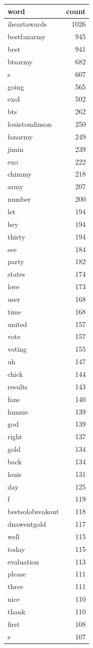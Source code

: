 \begin{tabular}{lr}
\toprule
word & count \\
\midrule
iheartawards & 1026 \\
bestfanarmy & 945 \\
best & 941 \\
btsarmy & 682 \\
s & 607 \\
going & 565 \\
exol & 502 \\
bts & 262 \\
louistomlinson & 250 \\
fanarmy & 249 \\
jimin & 239 \\
exo & 222 \\
chimmy & 218 \\
army & 207 \\
number & 200 \\
let & 194 \\
hey & 194 \\
thirty & 194 \\
see & 184 \\
party & 182 \\
states & 174 \\
love & 173 \\
user & 168 \\
time & 168 \\
united & 157 \\
vote & 157 \\
voting & 155 \\
uh & 147 \\
chick & 144 \\
results & 143 \\
fans & 140 \\
hunnie & 139 \\
god & 139 \\
right & 137 \\
gold & 134 \\
back & 134 \\
louis & 131 \\
day & 125 \\
f & 119 \\
bestsolobreakout & 118 \\
dnawentgold & 117 \\
well & 115 \\
today & 115 \\
evaluation & 113 \\
please & 111 \\
three & 111 \\
nice & 110 \\
thank & 110 \\
first & 108 \\
e & 107 \\
\bottomrule
\end{tabular}
